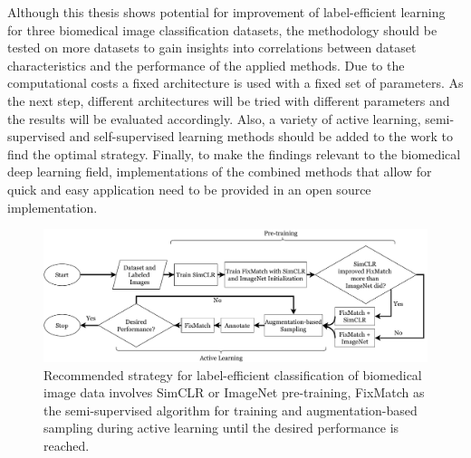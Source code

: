 Although this thesis shows potential for improvement of label-efficient learning for three biomedical image classification datasets, the methodology should be tested on more datasets to gain insights into correlations between dataset characteristics and the performance of the applied methods. Due to the computational costs a fixed architecture is used with a fixed set of parameters. As the next step, different architectures will be tried with different parameters and the results will be evaluated accordingly. Also, a variety of active learning, semi-supervised and self-supervised learning methods should be added to the work to find the optimal strategy. Finally, to make the findings relevant to the biomedical deep learning field, implementations of the combined methods that allow for quick and easy application need to be provided in an open source implementation.

\begin{figure}[htbp]
\centering
\captionsetup{format=plain}
\includegraphics[width=\textwidth]{figures/fig_conclusion.pdf}
\caption[Recommended Strategy]{Recommended strategy for label-efficient classification of biomedical image data involves SimCLR or ImageNet pre-training, FixMatch as the semi-supervised algorithm for training and augmentation-based sampling during active learning until the desired performance is reached.}
\label{fig:fig_conclusion}
\end{figure}